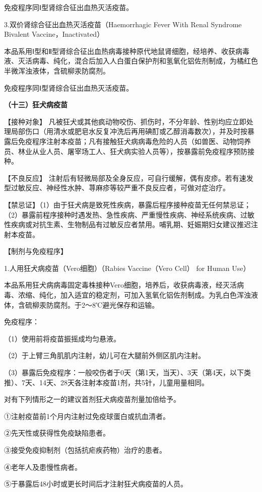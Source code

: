 免疫程序同Ⅰ型肾综合征出血热灭活疫苗。

3.双价肾综合征出血热灭活疫苗（Haemorrhagic Fever With Renal Syndrome
Bivalent Vaccine，Inactivated）

本品系用Ⅰ型和Ⅱ型肾综合征出血热病毒接种原代地鼠肾细胞，经培养、收获病毒液、灭活病毒、纯化，混合后加入人白蛋白保护剂和氢氧化铝佐剂制成，为橘红色半微浑浊液体，含硫柳汞防腐剂。

免疫程序同Ⅰ型肾综合征出血热灭活疫苗。

\textbf{（十三）狂犬病疫苗}

【接种对象】
凡被狂犬或其他疯动物咬伤、抓伤时，不分年龄、性别均应立即处理局部伤口（用清水或肥皂水反复冲洗后再用碘酊或乙醇消毒数次），并及时按暴露后免疫程序注射本疫苗；凡有接触狂犬病病毒危险的人员（如兽医、动物饲养员、林业从业人员、屠宰场工人、狂犬病实验人员等），按暴露前免疫程序预防接种。

【不良反应】
注射后有轻微局部及全身反应，可自行缓解，偶有皮疹。若有速发型过敏反应、神经性水肿、荨麻疹等较严重不良反应者，可做对症治疗。

【禁忌证】（1）由于狂犬病是致死性疾病，暴露后程序接种疫苗无任何禁忌证；（2）暴露前程序接种时遇发热、急性疾病、严重慢性疾病、神经系统疾病、过敏性疾病或对抗生素、生物制品有过敏反应者禁用。哺乳期、妊娠期妇女建议推迟注射本疫苗。

【制剂与免疫程序】

1.人用狂犬病疫苗（Vero细胞）（Rabies Vaccine（Vero Cell） for Human
Use）

本品系用狂犬病病毒固定毒株接种Vero细胞，培养后，收获病毒液，经灭活病毒、浓缩、纯化，加入适宜的稳定剂，可加入氢氧化铝佐剂制成。为乳白色浑浊液体，含硫柳汞防腐剂。于2～8℃避光保存和运输。

免疫程序：

（1）使用前将疫苗振摇成均匀悬液。

（2）于上臂三角肌肌内注射，幼儿可在大腿前外侧区肌内注射。

（3）暴露后免疫程序：一般咬伤者于0天（第1天，当天）、3天（第4天，以下类推）、7天、14天、28天各注射本疫苗1剂，共5针，儿童用量相同。

对有下列情形之一的建议首剂狂犬病疫苗剂量加倍给予。

①注射疫苗前1个月内注射过免疫球蛋白或抗血清者。

②先天性或获得性免疫缺陷患者。

③接受免疫抑制剂（包括抗疟疾药物）治疗的患者。

④老年人及患慢性病者。

⑤于暴露后48小时或更长时间后才注射狂犬病疫苗的人员。

